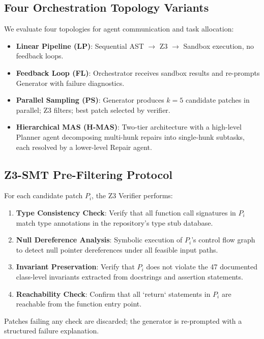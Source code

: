 \documentclass[10pt,twocolumn,letterpaper]{article}
\begin{document}
\subsection{Four Orchestration Topology Variants}


We evaluate four topologies for agent communication and task allocation:

\begin{itemize}
  \item \textbf{Linear Pipeline (LP)}: Sequential AST $\rightarrow$ Z3 $\rightarrow$ Sandbox execution, no feedback loops.
  \item \textbf{Feedback Loop (FL)}: Orchestrator receives sandbox results and re-prompts Generator with failure diagnostics.
  \item \textbf{Parallel Sampling (PS)}: Generator produces $k = 5$ candidate patches in parallel; Z3 filters; best patch selected by verifier.
  \item \textbf{Hierarchical MAS (H-MAS)}: Two-tier architecture with a high-level Planner agent decomposing multi-hunk repairs into single-hunk subtasks, each resolved by a lower-level Repair agent.
\end{itemize}


\subsection{Z3-SMT Pre-Filtering Protocol}


For each candidate patch $P_i$, the Z3 Verifier performs:

\begin{enumerate}
  \item \textbf{Type Consistency Check}: Verify that all function call signatures in $P_i$ match type annotations in the repository's type stub database.
  \item \textbf{Null Dereference Analysis}: Symbolic execution of $P_i$'s control flow graph to detect null pointer dereferences under all feasible input paths.
  \item \textbf{Invariant Preservation}: Verify that $P_i$ does not violate the 47 documented class-level invariants extracted from docstrings and assertion statements.
  \item \textbf{Reachability Check}: Confirm that all `return` statements in $P_i$ are reachable from the function entry point.
\end{enumerate}

Patches failing any check are discarded; the generator is re-prompted with a structured failure explanation.
\end{document}
